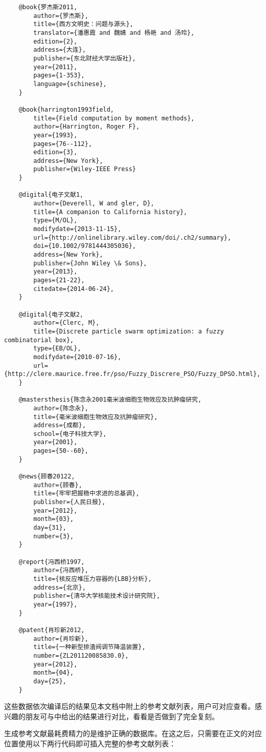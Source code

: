 \documentclass[print, promaster, vlined]{DissertUESTC}
\begin{document}
\begin{verbatim}
	@book{罗杰斯2011,
	    author={罗杰斯},
	    title={西方文明史：问题与源头},
	    translator={潘惠霞 and 魏婧 and 杨艳 and 汤玲},
	    edition={2},
	    address={大连},
	    publisher={东北财经大学出版社},
	    year={2011},
	    pages={1-353},
	    language={schinese},
	}
	
	@book{harrington1993field,
	    title={Field computation by moment methods},
	    author={Harrington, Roger F},
	    year={1993},
	    pages={76--112},
	    edition={3},
	    address={New York},
	    publisher={Wiley-IEEE Press}
	}
	
	@digital{电子文献1,
	    author={Deverell, W and gler, D},
	    title={A companion to California history},
	    type={M/OL},
	    modifydate={2013-11-15},
	    url={http://onlinelibrary.wiley.com/doi/.ch2/summary},
	    doi={10.1002/9781444305036},
	    address={New York},
	    publisher={John Wiley \& Sons},
	    year={2013},
	    pages={21-22},
	    citedate={2014-06-24},
	}
	
	@digital{电子文献2,
	    author={Clerc, M},
	    title={Discrete particle swarm optimization: a fuzzy combinatorial box},
	    type={EB/OL},
	    modifydate={2010-07-16},
	    url={http://clere.maurice.free.fr/pso/Fuzzy_Discrere_PSO/Fuzzy_DPSO.html},
	}
	
	@mastersthesis{陈念永2001毫米波细胞生物效应及抗肿瘤研究,
	    author={陈念永},
	    title={毫米波细胞生物效应及抗肿瘤研究},
	    address={成都},
	    school={电子科技大学},
	    year={2001},
	    pages={50--60},
	}
	
	@news{顾春20122,
	    author={顾春},
	    title={牢牢把握稳中求进的总基调},
	    publisher={人民日报},
	    year={2012},
	    month={03},
	    day={31},
	    number={3},
	}
	
	@report{冯西桥1997,
	    author={冯西桥},
	    title={核反应堆压力容器的{LBB}分析},
	    address={北京},
	    publisher={清华大学核能技术设计研究院},
	    year={1997},
	}
	
	@patent{肖珍新2012,
	    author={肖珍新},
	    title={一种新型排渣阀调节降温装置},
	    number={ZL201120085830.0},
	    year={2012},
	    month={04},
	    day={25},
	}
	\end{verbatim}
	
	这些数据依次编译后的结果见本文档中附上的参考文献列表，用户可对应查看。感兴趣的朋友可与\href{https://gr.uestc.edu.cn/xiazai/114/3917}{}中给出的结果进行对比，看看是否做到了完全复刻。
	
	生成参考文献最耗费精力的是维护正确的数据库。在这之后，只需要在正文的对应位置使用以下两行代码即可插入完整的参考文献列表：
	\begin{verbatim}
		
		
	\end{verbatim}
	
\end{document}
